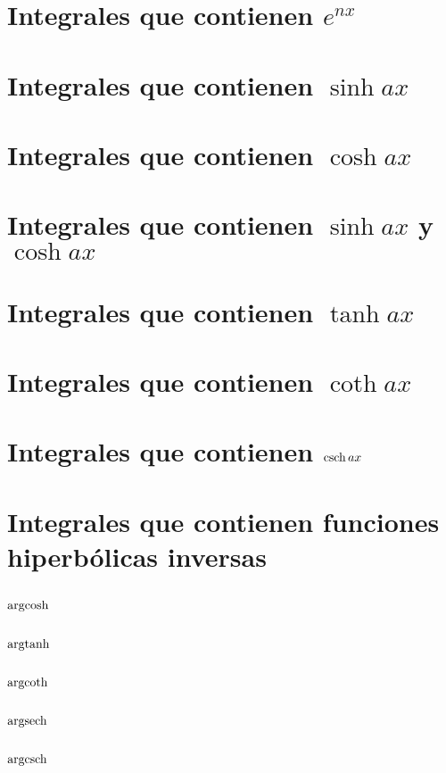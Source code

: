 \section{Integrales que contienen $ e^{nx}$}

\section{Integrales que contienen $\sinh ax$}

\section{Integrales que contienen $\cosh ax$}

\section{Integrales que contienen $\sinh ax$ y $\cosh ax$}

\section{Integrales que contienen $\tanh ax$}

\section{Integrales que contienen $\coth ax$}

\section{Integrales que contienen $\operatorname{csch} ax$}

\section{Integrales que contienen funciones hiperbólicas inversas}
\subsection{$\operatorname{argcosh} $}
\subsection{$\operatorname{argtanh} $}
\subsection{$\operatorname{argcoth} $}
\subsection{$\operatorname{argsech} $}
\subsection{$\operatorname{argcsch} $}